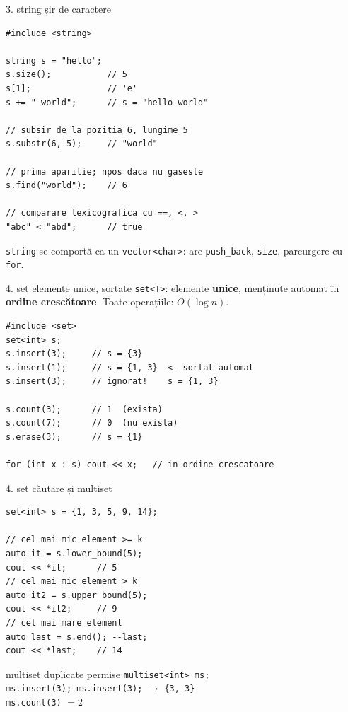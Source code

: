 ﻿\documentclass{beamer}
\begin{document}
\begin{frame}[fragile]{3. string \textemdash{} șir de caractere}
  \begin{lstlisting}
#include <string>

string s = "hello";
s.size();           // 5
s[1];               // 'e'
s += " world";      // s = "hello world"

// subsir de la pozitia 6, lungime 5
s.substr(6, 5);     // "world"

// prima aparitie; npos daca nu gaseste
s.find("world");    // 6

// comparare lexicografica cu ==, <, >
"abc" < "abd";      // true
  \end{lstlisting}

  \smallskip
  \texttt{string} se comportă ca un \texttt{vector<char>}:
  are \texttt{push\_back}, \texttt{size}, parcurgere cu \texttt{for}.
\end{frame}

\begin{frame}[fragile]{4. set \textemdash{} elemente unice, sortate}
  \texttt{set<T>}: elemente \textbf{unice}, menținute automat în
  \textbf{ordine crescătoare}. Toate operațiile: $O(\log n)$.

  \begin{lstlisting}
#include <set>
set<int> s;
s.insert(3);     // s = {3}
s.insert(1);     // s = {1, 3}  <- sortat automat
s.insert(3);     // ignorat!    s = {1, 3}

s.count(3);      // 1  (exista)
s.count(7);      // 0  (nu exista)
s.erase(3);      // s = {1}

for (int x : s) cout << x;   // in ordine crescatoare
  \end{lstlisting}
\end{frame}

\begin{frame}[fragile]{4. set \textemdash{} căutare și multiset}
  \begin{lstlisting}
set<int> s = {1, 3, 5, 9, 14};

// cel mai mic element >= k
auto it = s.lower_bound(5);
cout << *it;      // 5
// cel mai mic element > k
auto it2 = s.upper_bound(5);
cout << *it2;     // 9
// cel mai mare element
auto last = s.end(); --last;
cout << *last;    // 14
  \end{lstlisting}

  \begin{block}{multiset \textemdash{} duplicate permise}
    \texttt{multiset<int> ms;} \\
    \texttt{ms.insert(3); ms.insert(3);} $\rightarrow$ \texttt{\{3,\,3\}} \\
    \texttt{ms.count(3)} $= 2$
  \end{block}
\end{frame}
\end{document}
